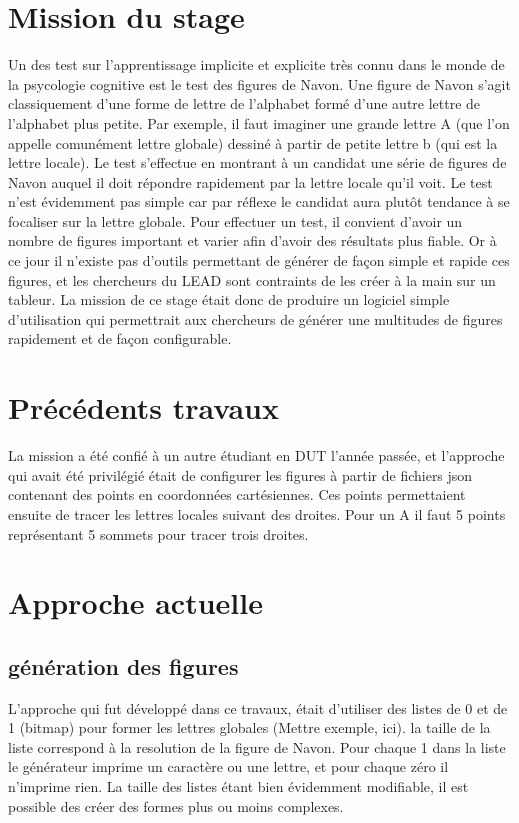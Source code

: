 \documentclass{article}
\begin{document}
	\section{Mission du stage}
	Un des test sur l'apprentissage implicite et explicite très connu dans le monde de la psycologie cognitive est le test des figures de Navon. Une figure de Navon s'agit classiquement d'une forme de lettre de l'alphabet formé d'une autre lettre de l'alphabet plus petite. Par exemple, il faut imaginer une grande lettre A (que l'on appelle comunément lettre globale) dessiné à partir de petite lettre b (qui est la lettre locale). Le test s'effectue en montrant à un candidat une série de figures de Navon auquel il doit répondre rapidement par la lettre locale qu'il voit. Le test n'est évidemment pas simple car par réflexe le candidat aura plutôt tendance à se focaliser sur la lettre globale.
	Pour effectuer un test, il convient d'avoir un nombre de figures important et varier afin d'avoir des résultats plus fiable. Or à ce jour il n'existe pas d'outils permettant de générer de façon simple et rapide ces figures, et les chercheurs du LEAD sont contraints de les créer à la main sur un tableur. 
	La mission de ce stage était donc de produire un logiciel simple d'utilisation qui permettrait aux chercheurs de générer une multitudes de figures rapidement et de façon configurable. 

	\section{Précédents travaux}
	La mission a été confié à un autre étudiant en DUT l'année passée, et l'approche qui avait été privilégié était de configurer les figures à partir de fichiers json contenant des points en coordonnées cartésiennes. Ces points permettaient ensuite de tracer les lettres locales suivant des droites. Pour un A il faut 5 points représentant 5 sommets pour tracer trois droites.


	\section{Approche actuelle}
	\subsection{génération des figures}
	L'approche qui fut développé dans ce travaux, était d'utiliser des listes de 0 et de 1 (bitmap) pour former les lettres globales (Mettre exemple, ici). la taille de la liste correspond à la resolution de la figure de Navon. Pour chaque 1 dans la liste le générateur imprime un caractère ou une lettre, et pour chaque zéro il n'imprime rien. La taille des listes étant bien évidemment modifiable, il est possible des créer des formes plus ou moins complexes. 
\end{document}
